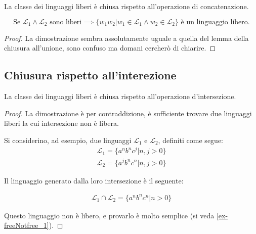 \documentclass[class=book, crop=false, oneside]{standalone}
\begin{document}
\begin{lemma}
  La classe dei linguaggi liberi è chiusa rispetto all'operazione di concatenazione.

  \begin{equation*}
    \textrm{Se } \mathcal{L}_1 \land \mathcal{L}_2 \textrm{ sono liberi} \implies \{w_1w_2 | w_1 \in \mathcal{L}_1 \land w_2 \in \mathcal{L}_2\} \textrm{ è un linguaggio libero.}
  \end{equation*}

\end{lemma}

\begin{proof}
  La dimostrazione sembra assolutamente uguale a quella del lemma della chiusura all'unione, sono confuso ma domani cercherò di chiarire.
\end{proof}

\subsection*{Chiusura rispetto all'interezione}

\begin{lemma}
  La classe dei linguaggi liberi è chiusa rispetto all'operazione d'intersezione.
\end{lemma}

\begin{proof}
  La dimostrazione è per contraddizione, è sufficiente trovare due linguaggi liberi la cui intersezione non è libera.

  Si considerino, ad esempio, due linguaggi $\mathcal{L}_1$ e $\mathcal{L}_2$, definiti come segue:
  \begin{align*}
      \mathcal{L}_1 = \{a^n b^n c^j | n, j > 0 \} \\
      \mathcal{L}_2 = \{a^j b^n c^n | n, j > 0 \}
  \end{align*}

  \noindent Il linguaggio generato dalla loro intersezione è il seguente:

  \begin{align*}
    \mathcal{L}_1 \cap \mathcal{L}_2 = \{ a^n b^n c^n | n > 0 \}
  \end{align*}

  \noindent Questo linguaggio non è libero, e provarlo è molto semplice (si veda \ref{ex-freeNotfree_1}).

\end{proof}
\end{document}
